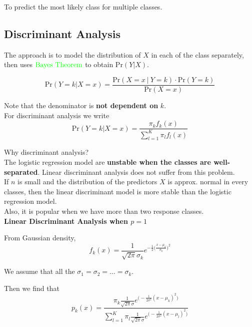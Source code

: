 \documentclass{article}
\begin{document}
To predict the most likely class for multiple classes.

\subsection{Discriminant Analysis}

The approach is to model the distribution of $X$ in each of the class separately, then uses $\color{green}{\mathrm{Bayes \ Theorem}}$ to obtain $\mathrm{Pr}(Y \vert X)$.

$$\mathrm{Pr}(Y = k \vert X = x) = \frac{\mathrm{Pr}(X = x \ \vert\ Y = k) \cdot \mathrm{Pr}(Y = k)}{\mathrm{Pr}(X = x)}$$

Note that the denominator is \textbf{not dependent on} $k$.\\

For discriminant analysis we write 
$$\mathrm{Pr}(Y = k \vert X = x) = \frac{\pi_k f_k(x)}{\sum_{l=1}^K \pi_l f_l(x)}$$

Why discriminant analysis?\\

The logistic regression model are \textbf{unstable when the classes are well-separated}. Linear discriminant analysis does not suffer from this problem.\\

If $n$ is small and the distribution of the predictors $X$ is approx. normal in every classes, then the linear discriminant model is more stable than the logistic regression model.\\

Also, it is popular when we have more than two response classes.\\

\textbf{Linear Discriminant Analysis when $p = 1$}

From Gaussian density, $$f_k(x) = \frac{1}{\sqrt{2\pi}\sigma_k}e^{-\frac{1}{2}\Big(\frac{x - \mu_k}{\sigma_k}\Big)^2}$$

We assume that all the $\sigma_1 = \sigma_2 = \dots = \sigma_k$.

Then we find that $$p_k(x) = \frac{\pi_k \frac{1}{\sqrt{2\pi}\sigma}e^{\Big(- \frac{1}{2\sigma^2}(x - \mu_k)^2\Big)}}{\sum_{l=1}^K \pi_l \frac{1}{\sqrt{2\pi}\sigma}e^{\Big(- \frac{1}{2\sigma^2}(x - \mu_l)^2\Big)}}$$
\end{document}
